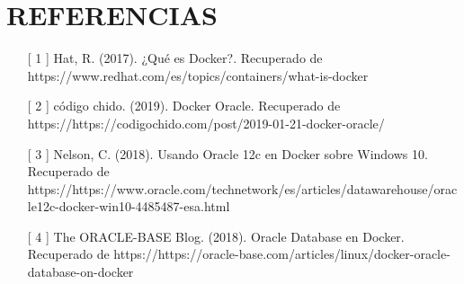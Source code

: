 \section{REFERENCIAS} 

\begin{itemize}
	\item [[ 1]] Hat, R. (2017). ¿Qué es Docker?. Recuperado de https://www.redhat.com/es/topics/containers/what-is-docker
	\item [[ 2]] código chido. (2019). Docker Oracle. Recuperado de https://https://codigochido.com/post/2019-01-21-docker-oracle/
         \item [[ 3]] Nelson, C. (2018). Usando Oracle 12c en Docker sobre Windows 10. Recuperado de https://https://www.oracle.com/technetwork/es/articles/datawarehouse/oracle12c-docker-win10-4485487-esa.html
         \item [[ 4]] The ORACLE-BASE Blog. (2018). Oracle Database en Docker. Recuperado de https://https://oracle-base.com/articles/linux/docker-oracle-database-on-docker
\end{itemize}


